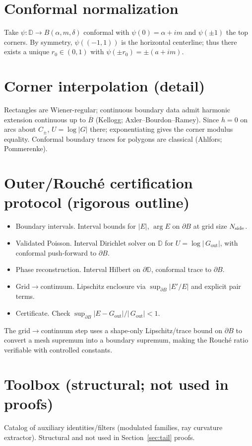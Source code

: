 \documentclass[11pt]{article}
\numberwithin{equation}{section}
\theoremstyle{remark}
\newcommand{\D}{\mathbb{D}}
\newcommand{\Gout}{G_{\mathrm{out}}}
\begin{document}
\section{Conformal normalization}
Take $\psi:\D\to B(\alpha,m,\delta)$ conformal with $\psi(0)=\alpha+i m$ and $\psi(\pm 1)$ the top corners. By symmetry, $\psi((-1,1))$ is the horizontal centerline; thus there exists a unique $r_0\in(0,1)$ with $\psi(\pm r_0)=\pm(a+im)$.

\section{Corner interpolation (detail)}
Rectangles are Wiener-regular; continuous boundary data admit harmonic extension continuous up to $\overline B$ (Kellogg; Axler--Bourdon--Ramey). Since $h=0$ on arcs about $C_\pm$, $U=\log|G|$ there; exponentiating gives the corner modulus equality. Conformal boundary traces for polygons are classical (Ahlfors; Pommerenke).

\section{Outer/Rouch\'e certification protocol (rigorous outline)}\label{app:cert}
\begin{itemize}
\item Boundary intervals. Interval bounds for $|E|$, $\arg E$ on $\partial B$ at grid size $N_{\rm side}$.
\item Validated Poisson. Interval Dirichlet solver on $\D$ for $U=\log|\,\Gout|$, with conformal push-forward to $\partial B$.
\item Phase reconstruction. Interval Hilbert on $\partial\D$, conformal trace to $\partial B$.
\item Grid$\to$continuum. Lipschitz enclosure via $\sup_{\partial B}|E'/E|$ and explicit pair terms.
\item Certificate. Check $\sup_{\partial B}|E-\Gout|/|\,\Gout|<1$.
\end{itemize}
The grid$\to$continuum step uses a shape-only Lipschitz/trace bound on $\partial B$ to convert a mesh supremum into a boundary supremum, making the Rouch\'e ratio verifiable with controlled constants.

\section{Toolbox (structural; not used in proofs)}
Catalog of auxiliary identities/filters (modulated families, ray curvature extractor). Structural and not used in Section~\ref{sec:tail} proofs.
\end{document}
